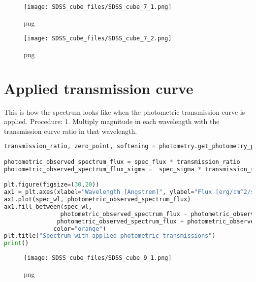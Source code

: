 \begin{figure}
\centering
\texttt{[image: SDSS\_cube\_files/SDSS\_cube\_7\_1.png]}
\caption{png}
\end{figure}

\begin{figure}
\centering
\texttt{[image: SDSS\_cube\_files/SDSS\_cube\_7\_2.png]}
\caption{png}
\end{figure}

\section{Applied transmission curve}\label{applied-transmission-curve}

This is how the spectrum looks like when the photometric transmission
curve is applied. Procedure: 1. Multiply magnitude in each wavelength
with the transmission curve ratio in that wavelength.

\begin{lstlisting}[language=Python]
transmission_ratio, zero_point, softening = photometry.get_photometry_params(spec_flux, spec_wl)

photometric_observed_spectrum_flux = spec_flux * transmission_ratio
photometric_observed_spectrum_flux_sigma =  spec_sigma * transmission_ratio

plt.figure(figsize=(30,20))
ax1 = plt.axes(xlabel="Wavelength [Angstrem]", ylabel="Flux [erg/cm^2/s/Ang]")
ax1.plot(spec_wl, photometric_observed_spectrum_flux)
ax1.fill_between(spec_wl, 
                photometric_observed_spectrum_flux - photometric_observed_spectrum_flux_sigma, 
               photometric_observed_spectrum_flux + photometric_observed_spectrum_flux_sigma, 
              color="orange")
plt.title("Spectrum with applied photometric transmissions")
print()
\end{lstlisting}

\begin{figure}
\centering
\texttt{[image: SDSS\_cube\_files/SDSS\_cube\_9\_1.png]}
\caption{png}
\end{figure}

